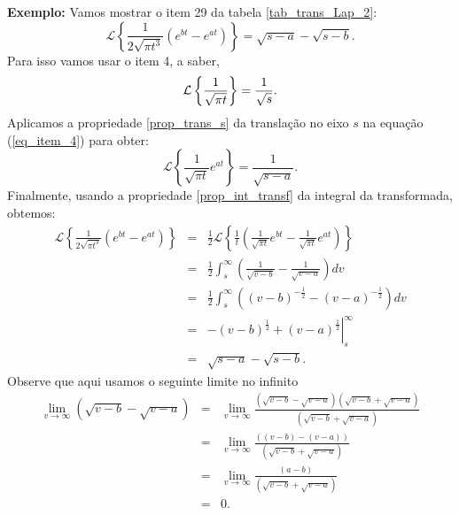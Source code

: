 \documentclass[a4paper,10pt]{book}
\begin{document}
{\bf Exemplo:} Vamos mostrar o item 29 da tabela \ref{tab_trans_Lap_2}:
 \begin{equation}
 \mathcal{L}\left\{\frac{1}{2\sqrt{\pi t^3}}\left(e^{bt}-e^{at}\right)\right\}=\sqrt{s-a}-\sqrt{s-b}.
 \end{equation}
 Para isso vamos usar o item 4, a saber,
 \begin{equation}{\label{eq_item_4}}
 \mathcal{L}\left\{\frac{1}{\sqrt{\pi t}}\right\}=\frac{1}{\sqrt{s}}.
 \end{equation}
 Aplicamos a propriedade \ref{prop_trans_s} da translação no eixo $s$ na equação (\ref{eq_item_4}) para obter:
 \begin{equation*}
 \mathcal{L}\left\{\frac{1}{\sqrt{\pi t}}e^{at}\right\}=\frac{1}{\sqrt{s-a}}.
 \end{equation*}
 Finalmente, usando a propriedade \ref{prop_int_transf} da integral da transformada, obtemos:
 \begin{eqnarray*}
 \mathcal{L}\left\{\frac{1}{2\sqrt{\pi t^3}}\left(e^{bt}-e^{at}\right)\right\}&=&\frac{1}{2}\mathcal{L}\left\{\frac{1}{t}\left(\frac{1}{\sqrt{\pi t}}e^{bt}-\frac{1}{\sqrt{\pi t}}e^{at}\right)\right\}\\
 &=&\frac{1}{2}\int_s^\infty\left(   \frac{1}{\sqrt{v-b}}-  \frac{1}{\sqrt{v-a}}\right)dv\\
 &=&\frac{1}{2}\int_s^\infty  \left( \left(v-b\right)^{-\frac{1}{2}}-  \left(v-a\right)^{-\frac{1}{2}}\right)dv\\
 &=&\left. -\left(v-b\right)^{\frac{1}{2}}+ \left(v-a\right)^{\frac{1}{2}}\right|_s^\infty\\
 &=&\sqrt{s-a}-\sqrt{s-b}.
 \end{eqnarray*}
 Observe que aqui usamos o seguinte limite no infinito
 \begin{eqnarray*}
 \lim_{v\to\infty}\left( \sqrt{v-b}- \sqrt{v-a}\right)&=&\lim_{v\to\infty}\frac{\left(\sqrt{v-b}- \sqrt{v-a}\right)\left(\sqrt{v-b}+ \sqrt{v-a}\right)}{\left(\sqrt{v-b}+ \sqrt{v-a}\right)}\\
 &=&\lim_{v\to\infty}\frac{\left((v-b)- (v-a)\right)}{\left(\sqrt{v-b}+ \sqrt{v-a}\right)}\\
 &=&\lim_{v\to\infty}\frac{\left(a-b\right)}{\left(\sqrt{v-b}+ \sqrt{v-a}\right)}\\
 &=&0.
 \end{eqnarray*}
\end{document}
